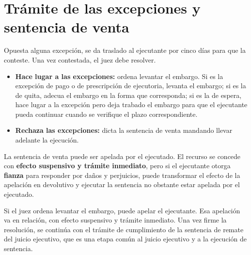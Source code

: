 \documentclass[12pt,oneside]{book}
\begin{document}
\section{Trámite de las excepciones y sentencia de venta}

Opuesta alguna excepción, se da traslado al ejecutante por cinco días para que la conteste. Una vez contestada, el juez debe resolver. %

\begin{itemize}
    \item \textbf{Hace lugar a las excepciones:} ordena levantar el embargo. Si es la excepción de pago o de prescripción de ejecutoria, levanta el embargo; si es la de quita, adecua el embargo en la forma que corresponda; si es la de espera, hace lugar a la excepción pero deja trabado el embargo para que el ejecutante pueda continuar cuando se verifique el plazo correspondiente.
    \item \textbf{Rechaza las excepciones:} dicta la sentencia de venta mandando llevar adelante la ejecución.
\end{itemize}

La sentencia de venta puede ser apelada por el ejecutado. El recurso se concede con \textbf{efecto suspensivo y trámite inmediato}, pero si el ejecutante otorga \textbf{fianza} para responder por daños y perjuicios, puede transformar el efecto de la apelación en devolutivo y ejecutar la sentencia no obstante estar apelada por el ejecutado.

Si el juez ordena levantar el embargo, puede apelar el ejecutante. Esa apelación va en relación, con efecto suspensivo y trámite inmediato. Una vez firme la resolución, se continúa con el trámite de cumplimiento de la sentencia de remate del juicio ejecutivo, que es una etapa común al juicio ejecutivo y a la ejecución de sentencia.
\end{document}
